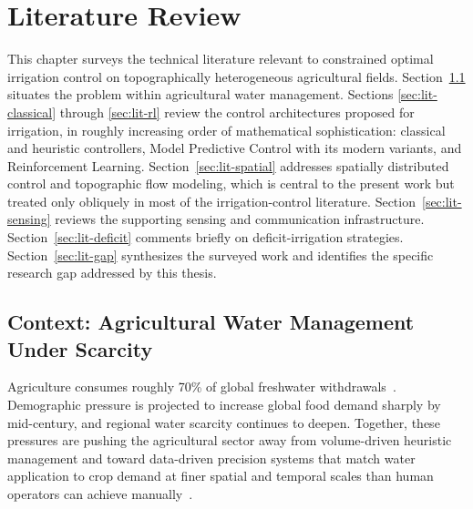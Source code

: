 %

\chapter{Literature Review}
\label{chap:lit}

This chapter surveys the technical literature relevant to constrained
optimal irrigation control on topographically heterogeneous
agricultural fields. Section~\ref{sec:lit-context} situates the
problem within agricultural water management. Sections
\ref{sec:lit-classical} through \ref{sec:lit-rl} review the control
architectures proposed for irrigation, in roughly increasing order of
mathematical sophistication: classical and heuristic controllers,
Model Predictive Control with its modern variants, and Reinforcement
Learning. Section~\ref{sec:lit-spatial} addresses spatially
distributed control and topographic flow modeling, which is central
to the present work but treated only obliquely in most of the
irrigation-control literature. Section~\ref{sec:lit-sensing} reviews
the supporting sensing and communication infrastructure.
Section~\ref{sec:lit-deficit} comments briefly on deficit-irrigation
strategies. Section~\ref{sec:lit-gap} synthesizes the surveyed work
and identifies the specific research gap addressed by this thesis.

\section{Context: Agricultural Water Management Under Scarcity}
\label{sec:lit-context}

Agriculture consumes roughly 70\% of global freshwater
withdrawals~\cite{Sharma2025,Bayar2025}. Demographic pressure is
projected to increase global food demand sharply by mid-century, and
regional water scarcity continues to deepen. Together, these
pressures are pushing the agricultural sector away from
volume-driven heuristic management and toward data-driven precision
systems that match water application to crop demand at finer spatial
and temporal scales than human operators can achieve
manually~\cite{Sharma2025,LopezJimenez2022,Mgana2026}.

